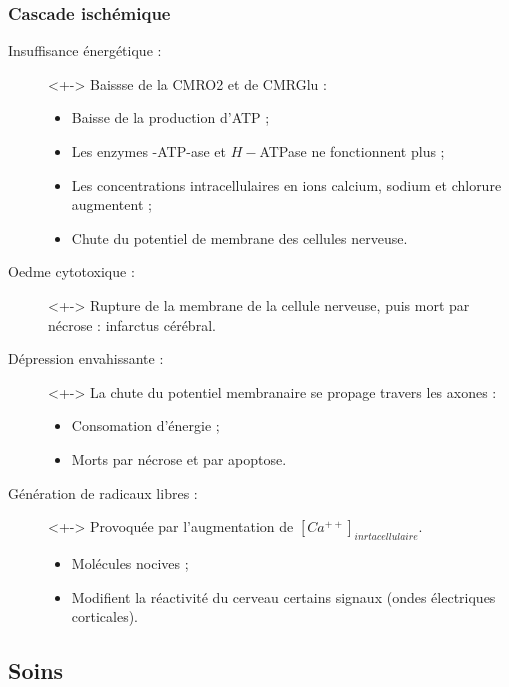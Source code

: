 \subsubsection{Cascade isch\'emique}

\begin{frame}
\begin{description}
\item[Insuffisance \'energ\'etique :]<+-> Baissse de la CMRO2 et de CMRGlu :
\begin{itemize}
\item<+-> Baisse de la production d'ATP ;
\item<+-> Les enzymes -ATP-ase et $H-$ATPase ne fonctionnent plus ;
\item<+-> Les concentrations intracellulaires en ions calcium, sodium et chlorure augmentent ;
\item<+-> Chute du potentiel de membrane des cellules nerveuse.
\end{itemize}
%
\item[Oedme cytotoxique :]<+-> Rupture de la membrane de la cellule nerveuse, puis mort par n\'ecrose : infarctus c\'er\'ebral.
\end{description}
\end{frame}

\begin{frame}
\begin{description}
\item[D\'epression envahissante :]<+-> La chute du potentiel membranaire se propage  travers les axones :
\begin{itemize}
\item<+-> Consomation d'\'energie ;
\item<+-> Morts par n\'ecrose et par apoptose.
\end{itemize}
%
\item[G\'en\'eration de radicaux libres :]<+-> Provoqu\'ee par l'augmentation de $[Ca^{++}]_{inrtacellulaire}$.
\begin{itemize}
\item<+-> Mol\'ecules nocives ;
\item<+-> Modifient la r\'eactivit\'e du cerveau  certains signaux (ondes \'electriques corticales).
\end{itemize}
\end{description}
\end{frame}


\subsection{Soins}

